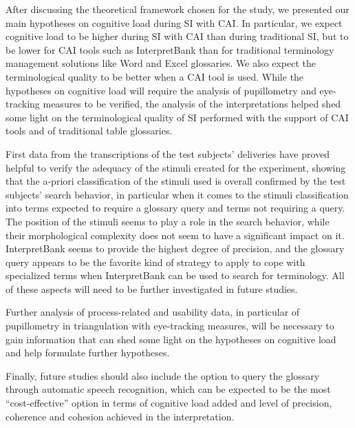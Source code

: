 \documentclass[output=paper]{langsci/langscibook}
\begin{document}
After discussing the theoretical framework chosen for the study, we presented our main hypotheses on cognitive load during \textsc{SI} with \textsc{CAI}. In particular, we expect cognitive load to be higher during \textsc{SI} with \textsc{CAI} than during traditional \textsc{SI}, but to be lower for \textsc{CAI} tools such as InterpretBank than for traditional terminology management solutions like Word and Excel glossaries. We also expect the terminological quality to be better when a \textsc{CAI} tool is used. While the hypotheses on cognitive load will require the analysis of pupillometry and eye-tracking measures to be verified, the analysis of the interpretations helped shed some light on the terminological quality of \textsc{SI} performed with the support of \textsc{CAI} tools and of traditional table glossaries. 

First data from the transcriptions of the test subjects’ deliveries have proved helpful to verify the adequacy of the stimuli created for the experiment, showing that the a-priori classification of the stimuli used is overall confirmed by the test subjects’ search behavior, in particular when it comes to the stimuli classification into terms expected to require a glossary query and terms not requiring a query. The position of the stimuli seems to play a role in the search behavior, while their morphological complexity does not seem to have a significant impact on it. InterpretBank seems to provide the highest degree of precision, and the glossary query appears to be the favorite kind of strategy to apply to cope with specialized terms when InterpretBank can be used to search for terminology. All of these aspects will need to be further investigated in future studies.

Further analysis of process-related and usability data, in particular of pupillometry in triangulation with eye-tracking measures, will be necessary to gain information that can shed some light on the hypotheses on cognitive load and help formulate further hypotheses.

Finally, future studies should also include the option to query the glossary through automatic speech recognition, which can be expected to be the most ``cost-effective'' option in terms of cognitive load added and level of precision, coherence and cohesion achieved in the interpretation. 
\sloppy
\printbibliography[heading=subbibliography,notkeyword=this] 
\end{document}

